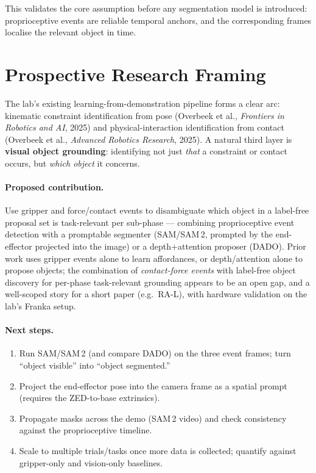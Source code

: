 \documentclass[11pt]{article}
\begin{document}
This validates the core assumption before any segmentation model is introduced:
proprioceptive events are reliable temporal anchors, and the corresponding
frames localise the relevant object in time.

\section{Prospective Research Framing}

The lab's existing learning-from-demonstration pipeline forms a clear arc:
kinematic constraint identification from pose
(Overbeek et al., \emph{Frontiers in Robotics and AI}, 2025) and physical-interaction
identification from contact (Overbeek et al., \emph{Advanced Robotics Research},
2025). A natural third layer is \textbf{visual object grounding}: identifying not
just \emph{that} a constraint or contact occurs, but \emph{which object} it
concerns.

\paragraph{Proposed contribution.} Use gripper and force/contact events to
disambiguate which object in a label-free proposal set is task-relevant per
sub-phase --- combining proprioceptive event detection with a promptable
segmenter (SAM/SAM\,2, prompted by the end-effector projected into the image) or
a depth+attention proposer (DADO). Prior work uses gripper events alone to learn
affordances, or depth/attention alone to propose objects; the combination of
\emph{contact-force events} with label-free object discovery for per-phase
task-relevant grounding appears to be an open gap, and a well-scoped story for a
short paper (e.g.\ RA-L), with hardware validation on the lab's Franka setup.

\paragraph{Next steps.}
\begin{enumerate}[noitemsep]
  \item Run SAM/SAM\,2 (and compare DADO) on the three event frames; turn
        ``object visible'' into ``object segmented.''
  \item Project the end-effector pose into the camera frame as a spatial prompt
        (requires the ZED-to-base extrinsics).
  \item Propagate masks across the demo (SAM\,2 video) and check consistency
        against the proprioceptive timeline.
  \item Scale to multiple trials/tasks once more data is collected; quantify
        against gripper-only and vision-only baselines.
\end{enumerate}
\end{document}
